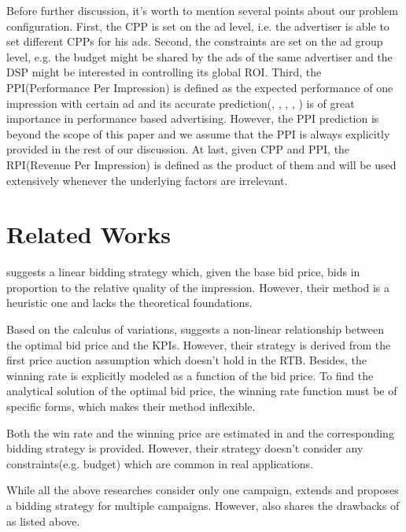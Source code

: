 \documentclass{article}
\begin{document}
Before further discussion, it's worth to mention several points about our problem configuration.
First, the CPP is set on the ad level, i.e. the advertiser is able to set different CPPs for his ads.
Second, the constraints are set on the ad group level,
    e.g. the budget might be shared by the ads of the same advertiser
    and the DSP might be interested in controlling its global ROI.
Third, the PPI(Performance Per Impression) is defined as the expected performance of one impression with certain ad
    and its accurate prediction(\cite{Google2013}, \cite{Facebook2014}, \cite{FFM2016}, \cite{CVR}, \cite{DelayedFeedback})
    is of great importance in performance based advertising.
However, the PPI prediction is beyond the scope of this paper
    and we assume that the PPI is always explicitly provided in the rest of our discussion.
At last, given CPP and PPI, the RPI(Revenue Per Impression) is defined as the product of them
    and will be used extensively whenever the underlying factors are irrelevant.

\section{Related Works}

\cite{M6D} suggests a linear bidding strategy which, given the base bid price,
    bids in proportion to the relative quality of the impression.
However, their method is a heuristic one and lacks the theoretical foundations.

Based on the calculus of variations, \cite{WeinanZhang2014} suggests a non-linear relationship between the optimal bid price and the KPIs.
However, their strategy is derived from the first price auction assumption which doesn't hold in the RTB.
Besides, the winning rate is explicitly modeled as a function of the bid price.
To find the analytical solution of the optimal bid price,
    the winning rate function must be of specific forms,
    which makes their method inflexible.

Both the win rate and the winning price are estimated in \cite{XiangLi2014} and the corresponding bidding strategy is provided.
However, their strategy doesn't consider any constraints(e.g. budget) which are common in real applications.

While all the above researches consider only one campaign,
    \cite{WeinanZhang2015} extends \cite{WeinanZhang2014} and proposes a bidding strategy for multiple campaigns.
However, \cite{WeinanZhang2015} also shares the drawbacks of \cite{WeinanZhang2014} as listed above.
\end{document}
